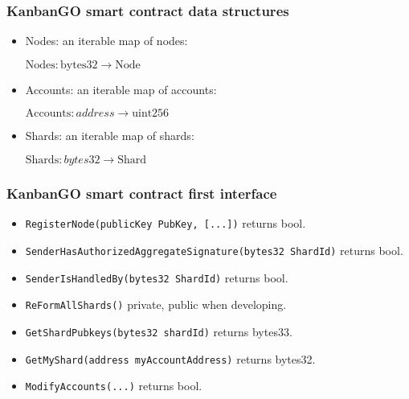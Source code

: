\begin{frame}
\frametitle{KanbanGO smart contract data structures}
\begin{itemize}
\item Nodes: an iterable map of nodes: 

\hfil\hfil
$\text{Nodes}:\text{bytes32}\to \text{Node}$
\item Accounts: an iterable map of accounts:

\hfil\hfil$\text{Accounts}: address \to \text{uint256}$
\item Shards: an iterable map of shards:

\hfil\hfil$\text{Shards}: bytes32 \to \text{Shard}$
\end{itemize}
\end{frame}

\begin{frame}[fragile]
\frametitle{KanbanGO smart contract first interface}

\begin{itemize}
\item \verb|RegisterNode(publicKey PubKey, [...])| returns bool.
\item \verb|SenderHasAuthorizedAggregateSignature(bytes32 ShardId)| returns bool.
\item \verb|SenderIsHandledBy(bytes32 ShardId)| returns bool.
\item \verb|ReFormAllShards()| private, public when developing.
\item \verb|GetShardPubkeys(bytes32 shardId)| returns bytes33.
\item \verb|GetMyShard(address myAccountAddress)| returns bytes32.
\item \verb|ModifyAccounts(...)| returns bool.
\end{itemize}
\end{frame}


